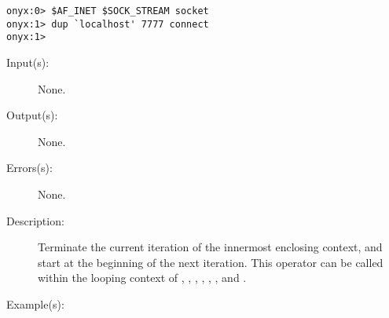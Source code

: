 \begin{description}
\begin{description}
\begin{verbatim}
onyx:0> $AF_INET $SOCK_STREAM socket
onyx:1> dup `localhost' 7777 connect
onyx:1>
		\end{verbatim}
	\end{description}
\label{systemdict:continue}
\item[{\onyxop{--}{continue}{--}}: ]
	\begin{description}\item[]
	\item[Input(s): ] None.
	\item[Output(s): ] None.
	\item[Errors(s): ] None.
	\item[Description: ]
		Terminate the current iteration of the innermost enclosing
		context, and start at the beginning of the next iteration.
		This operator can be called within the looping context of
		,
		,
		,
		,
		,
		, and
		.
	\item[Example(s): ]\begin{verbatim}


\end{verbatim}
\end{description}
\end{description}
